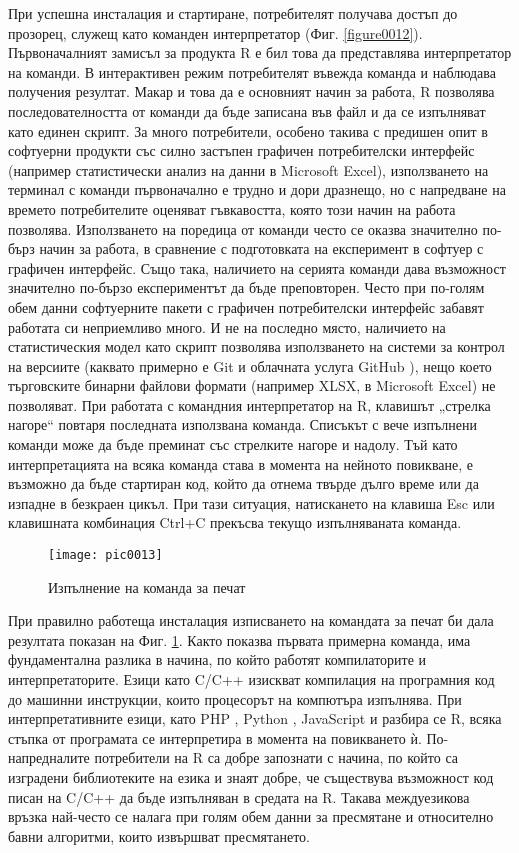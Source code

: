 При успешна инсталация и стартиране, потребителят получава достъп до прозорец, служещ като команден интерпретатор (Фиг. \ref{figure0012}). Първоначалният замисъл за продукта R е бил това да представлява интерпретатор на команди. В интерактивен режим потребителят въвежда команда и наблюдава получения резултат. Макар и това да е основният начин за работа, R позволява последователността от команди да бъде записана във файл и да се изпълняват като единен скрипт. За много потребители, особено такива с предишен опит в софтуерни продукти със силно застъпен графичен потребителски интерфейс (например статистически анализ на данни в Microsoft Excel), използването на терминал с команди първоначално е трудно и дори дразнещо, но с напредване на времето потребителите оценяват гъвкавостта, която този начин на работа позволява. Използването на поредица от команди често се оказва значително по-бърз начин за работа, в сравнение с подготовката на експеримент в софтуер с графичен интерфейс. Също така, наличието на серията команди дава възможност значително по-бързо експериментът да бъде преповторен. Често при по-голям обем данни софтуерните пакети с графичен потребителски интерфейс забавят работата си неприемливо много. И не на последно място, наличието на статистическия модел като скрипт позволява използването на системи за контрол на версиите (каквато примерно е Git и облачната услуга GitHub \cite{github}), нещо което търговските бинарни файлови формати (например XLSX, в Microsoft Excel) не позволяват. При работата с командния интерпретатор на R, клавишът „стрелка нагоре“ повтаря последната използвана команда. Списъкът с вече изпълнени команди може да бъде преминат със стрелките нагоре и надолу. Тъй като интерпретацията на всяка команда става в момента на нейното повикване, е възможно да бъде стартиран код, който да отнема твърде дълго време или да изпадне в безкраен цикъл. При тази ситуация, натискането на клавиша Esc или клавишната комбинация Ctrl+C прекъсва текущо изпълняваната команда. 

\begin{figure}[h]
  \centering
  \texttt{[image: pic0013]}
  \caption{Изпълнение на команда за печат}
\label{figure0013}
\end{figure}
\FloatBarrier

При правилно работеща инсталация изписването на командата за печат би дала резултата показан на Фиг. \ref{figure0013}. Както показва първата примерна команда, има фундаментална разлика в начина, по който работят компилаторите и интерпретаторите. Езици като C/C++ изискват компилация на програмния код до машинни инструкции, които процесорът на компютъра изпълнява. При интерпретативните езици, като PHP \cite{php}, Python \cite{python}, JavaScript \cite{javascript} и разбира се R, всяка стъпка от програмата се интерпретира в момента на повикването ѝ. По-напредналите потребители на R са добре запознати с начина, по който са изградени библиотеките на езика и знаят добре, че съществува възможност код писан на C/C++ да бъде изпълняван в средата на R. Такава междуезикова връзка най-често се налага при голям обем данни за пресмятане и относително бавни алгоритми, които извършват пресмятането.

